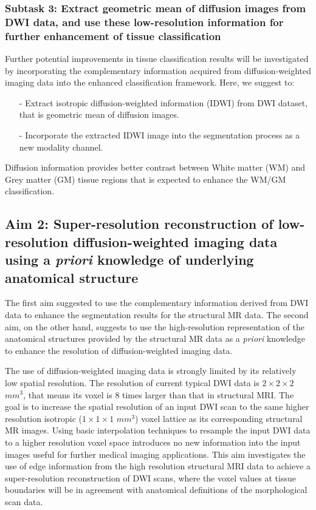 \subsubsection{Subtask 3: Extract geometric mean of diffusion images from DWI data, and use these low-resolution information for further enhancement of tissue classification}

Further potential improvements in tissue classification results will be investigated by incorporating the complementary information acquired from diffusion-weighted imaging data into the enhanced classification framework. Here, we suggest to:
\begin{itemize}
    \item[-] Extract isotropic diffusion-weighted information (IDWI) from DWI dataset, that is geometric mean of diffusion images.
    \item[-] Incorporate the extracted IDWI image into the segmentation process as a new modality channel.
\end{itemize}

\noindent 
Diffusion information provides better contrast between White matter (WM) and Grey matter (GM) tissue regions that is expected to enhance the WM/GM classification.
\newline

\subsection{Aim 2: Super-resolution reconstruction of low-resolution diffusion-weighted imaging data using a \emph{priori} knowledge of underlying anatomical structure}

The first aim suggested to use the complementary information derived from DWI data to enhance the segmentation results for the structural MR data.
The second aim, on the other hand, suggests to use the high-resolution representation of the anatomical structures provided by the structural MR data as a \emph{priori} knowledge to enhance the resolution of diffusion-weighted imaging data.

The use of diffusion-weighted imaging data is strongly limited by its relatively low spatial resolution. The resolution of current typical DWI data is $2 \times 2 \times 2$  $mm^3$, that means its voxel is $8$ times larger than that in structural MRI.
The goal is to increase the spatial resolution of an input DWI scan to the same higher resolution isotropic ($1\times1\times1$ $mm^3$) voxel lattice as its corresponding structural MR images. Using basic interpolation techniques to resample the input DWI data to a higher resolution voxel space introduces no new information into the input images useful for further medical imaging applications. This aim investigates the use of edge information from the high resolution structural MRI data to achieve a super-resolution reconstruction of DWI scans, where the voxel values at tissue boundaries will be in agreement with  anatomical definitions of the morphological scan data.
\newline
